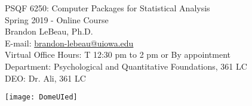 \documentclass[11pt,article,oneside]{memoir}
\begin{document}
\setsansfont[Mapping=tex-text]{Myriad Pro} 
\setmonofont[Mapping=tex-text,Scale=0.8]{Pragmata} 

\def\ind{\hangindent=1 true cm\hangafter=1 \noindent}
\def\labelitemi{$\cdot$}


  

\begin{minipage}[b]{.7\linewidth}
\begin{flushleft}
{\huge PSQF 6250: Computer Packages for Statistical Analysis} \\[.1in]
{\large\sffamily Spring 2019 - Online Course} \\
\vspace*{.25in}
{\large Brandon LeBeau, Ph.D.} \\[.05in]
{\normalsize E-mail: \href{mailto:brandon-lebeau@uiowa.edu}{brandon-lebeau@uiowa.edu} \\Virtual Office Hours: T 12:30 pm to 2 pm or By appointment 
   \\ Department: Psychological and Quantitative Foundations, 361 LC \\ DEO: Dr. Ali, 361 LC}
\end{flushleft}
\end{minipage}
\begin{minipage}[t]{.3\linewidth}
\texttt{[image: DomeUIed]}
\end{minipage}

\vspace{.25in}
\end{document}
